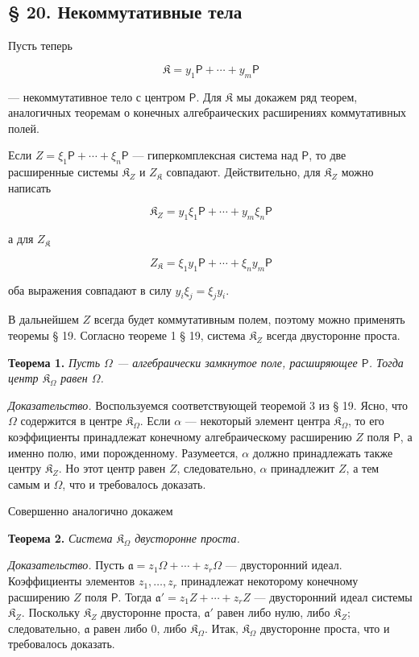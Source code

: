 \documentclass[11pt]{article}
\begin{document}
\subsection*{§ 20. Некоммутативные тела}\label{nichtkommutative-koerper}

Пусть теперь

\[
\mathfrak K=y_1\mathsf P+\cdots+y_m\mathsf P
\]

--- некоммутативное тело с центром \(\mathsf P\). Для \(\mathfrak K\) мы докажем ряд теорем, аналогичных теоремам о конечных алгебраических расширениях коммутативных полей.

Если \(Z=\xi_1\mathsf P+\cdots+\xi_n\mathsf P\) --- гиперкомплексная система над \(\mathsf P\), то две расширенные системы \(\mathfrak K_Z\) и \(Z_{\mathfrak K}\) совпадают. Действительно, для \(\mathfrak K_Z\) можно написать

\[
\mathfrak K_Z=y_1\xi_1\mathsf P+\cdots+y_m\xi_n\mathsf P
\]

а для \(Z_{\mathfrak K}\)

\[
Z_{\mathfrak K}=\xi_1y_1\mathsf P+\cdots+\xi_ny_m\mathsf P
\]

оба выражения совпадают в силу \(y_i\xi_j=\xi_jy_i\).

В дальнейшем \(Z\) всегда будет коммутативным полем, поэтому можно применять теоремы § 19. Согласно теореме 1 § 19, система \(\mathfrak K_Z\) всегда двусторонне проста.

\textbf{Теорема 1.} \emph{Пусть \(\Omega\) --- алгебраически замкнутое поле, расширяющее \(\mathsf P\). Тогда центр \(\mathfrak K_\Omega\) равен \(\Omega\).}

\emph{Доказательство.} Воспользуемся соответствующей теоремой 3 из § 19. Ясно, что \(\Omega\) содержится в центре \(\mathfrak K_\Omega\). Если \(\alpha\) --- некоторый элемент центра \(\mathfrak K_\Omega\), то его коэффициенты принадлежат конечному алгебраическому расширению \(Z\) поля \(\mathsf P\), а именно полю, ими порожденному. Разумеется, \(\alpha\) должно принадлежать также центру \(\mathfrak K_Z\). Но этот центр равен \(Z\), следовательно, \(\alpha\) принадлежит \(Z\), а тем самым и \(\Omega\), что и требовалось доказать.

Совершенно аналогично докажем

\textbf{Теорема 2.} \emph{Система \(\mathfrak K_\Omega\) двусторонне проста.}

\emph{Доказательство.} Пусть \(\mathfrak a=z_1\Omega+\cdots+z_r\Omega\) --- двусторонний идеал. Коэффициенты элементов \(z_1,\ldots,z_r\) принадлежат некоторому конечному расширению \(Z\) поля \(\mathsf P\). Тогда \(\mathfrak a'=z_1Z+\cdots+z_rZ\) --- двусторонний идеал системы \(\mathfrak K_Z\). Поскольку \(\mathfrak K_Z\) двусторонне проста, \(\mathfrak a'\) равен либо нулю, либо \(\mathfrak K_Z\); следовательно, \(\mathfrak a\) равен либо 0, либо \(\mathfrak K_\Omega\). Итак, \(\mathfrak K_\Omega\) двусторонне проста, что и требовалось доказать.
\end{document}
